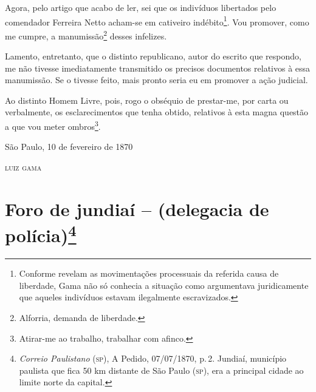 Agora, pelo artigo que acabo de ler, sei que os indivíduos libertados
pelo comendador Ferreira Netto acham-se em cativeiro
indébito\footnote{ Conforme revelam as movimentações processuais da
  referida causa de liberdade, Gama não só conhecia a situação como
  argumentava juridicamente que aqueles indivíduos estavam ilegalmente
  escravizados.}. Vou promover, como me cumpre, a manumissão\footnote{
  Alforria, demanda de liberdade.} desses infelizes.

Lamento, entretanto, que o distinto republicano, autor do escrito que
respondo, me não tivesse imediatamente transmitido os precisos
documentos relativos à essa manumissão. Se o tivesse feito, mais pronto
seria eu em promover a ação judicial.

Ao distinto Homem Livre, pois, rogo o obséquio de prestar-me, por carta
ou verbalmente, os esclarecimentos que tenha obtido, relativos à esta
magna questão a que vou meter ombros\footnote{ Atirar-me ao trabalho,
  trabalhar com afinco.}.

\begin{flushright}
São Paulo, 10 de fevereiro de 1870

\textsc{luiz gama}
\end{flushright}

\chapter{Foro de jundiaí -- (delegacia de polícia)\footnote{\emph{Correio Paulistano} (\textsc{sp}), A Pedido, 07/07/1870,
  p.\,2. Jundiaí, município paulista que fica 50 km distante de São Paulo
  (\textsc{sp}), era a principal cidade ao limite norte da capital.}} %

